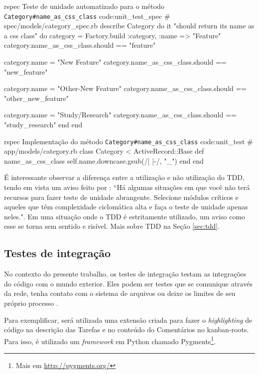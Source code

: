 \begin{mycode}{rspec}%
{Teste de unidade automatizado para o método \texttt{Category\#name\_as\_css\_class} }{code:unit_test_spec}
# spec/models/category_spec.rb
describe Category do
  it "should return its name as a css class" do
    category = Factory.build :category, :name => "Feature"
    category.name_as_css_class.should == "feature"

    category.name = "New Feature"
    category.name_as_css_class.should == "new_feature"

    category.name = "Other-New Feature"
    category.name_as_css_class.should == "other_new_feature"

    category.name = "Study/Research"
    category.name_as_css_class.should == "study_research"
  end
end
\end{mycode}

\begin{mycode}{rspec}%
{Implementação do método \texttt{Category\#name\_as\_css\_class} }{code:unit_test}
# app/models/category.rb
class Category < ActiveRecord::Base
  def name_as_css_class
    self.name.downcase.gsub(/\/| |-/, "_")
  end
end
\end{mycode}

É interessante observar a diferença entre a utilização e não utilização do TDD, tendo em vista um aviso feito por : ``Há algumas situações em que você não terá recursos para fazer teste de unidade abrangente. Selecione módulos críticos e aqueles que têm complexidade ciclomática alta e faça o teste de unidade apenas neles.". Em uma situação onde o TDD é estritamente utilizado, um aviso como esse se torna sem sentido e risível. Mais sobre TDD na Seção \ref{sec:tdd}.


\subsection{Testes de integração}
\label{sub:testes_de_integracao}

No contexto do presente trabalho, os testes de integração testam as integrações do código com o mundo exterior. Eles podem ser testes que se comunique através da rede, tenha contato com o sistema de arquivos ou deixe os limites de seu próprio processo \cite{ArtOfAgileDevelopment}.

Para exemplificar, será utilizada uma extensão criada para fazer o \textit{highlighting} de código na descrição das Tarefas e no conteúdo do Comentários no kanban-roots. Para isso, é utilizado um \textit{framework} em Python chamado Pygments\footnote{ Mais em \url{http://pygments.org/}}.

